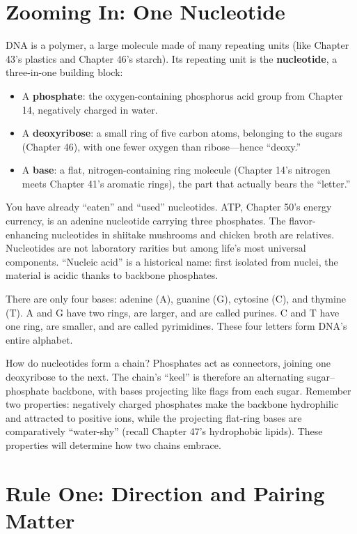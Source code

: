 \section{Zooming In: One Nucleotide}

DNA is a polymer, a large molecule made of many repeating units (like Chapter 43's plastics and Chapter 46's starch). Its repeating unit is the \textbf{nucleotide}, a three-in-one building block:

\begin{itemize}[itemsep=2pt]
\item A \textbf{phosphate}: the oxygen-containing phosphorus acid group from Chapter 14, negatively charged in water.
\item A \textbf{deoxyribose}: a small ring of five carbon atoms, belonging to the sugars (Chapter 46), with one fewer oxygen than ribose---hence ``deoxy.''
\item A \textbf{base}: a flat, nitrogen-containing ring molecule (Chapter 14's nitrogen meets Chapter 41's aromatic rings), the part that actually bears the ``letter.''
\end{itemize}

You have already ``eaten'' and ``used'' nucleotides. ATP, Chapter 50's energy currency, is an adenine nucleotide carrying three phosphates. The flavor-enhancing nucleotides in shiitake mushrooms and chicken broth are relatives. Nucleotides are not laboratory rarities but among life's most universal components. ``Nucleic acid'' is a historical name: first isolated from nuclei, the material is acidic thanks to backbone phosphates.

There are only four bases: adenine (A), guanine (G), cytosine (C), and thymine (T). A and G have two rings, are larger, and are called purines. C and T have one ring, are smaller, and are called pyrimidines. These four letters form DNA's entire alphabet.

How do nucleotides form a chain? Phosphates act as connectors, joining one deoxyribose to the next. The chain's ``keel'' is therefore an alternating sugar--phosphate backbone, with bases projecting like flags from each sugar. Remember two properties: negatively charged phosphates make the backbone hydrophilic and attracted to positive ions, while the projecting flat-ring bases are comparatively ``water-shy'' (recall Chapter 47's hydrophobic lipids). These properties will determine how two chains embrace.

\section{Rule One: Direction and Pairing Matter}

